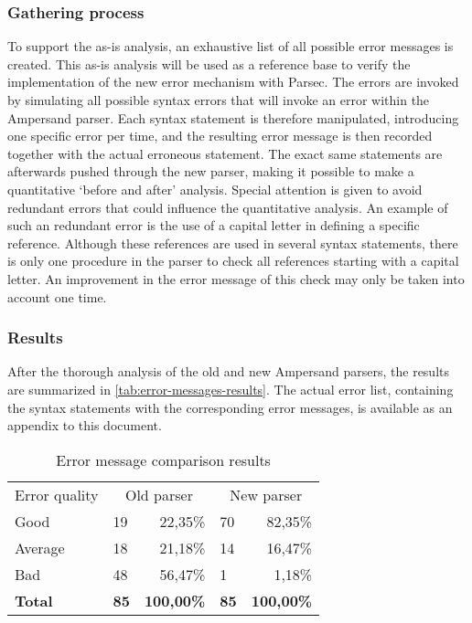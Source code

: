 \subsubsection{Gathering process}

To support the as-is analysis, an exhaustive list of all possible error messages is created.
This as-is analysis will be used as a reference base to verify the implementation of the new error mechanism with Parsec.
The errors are invoked by simulating all possible syntax errors that will invoke an error within the Ampersand parser.
Each syntax statement is therefore manipulated, introducing one specific error per time, and the resulting error message is then recorded together with the actual erroneous statement.
The exact same statements are afterwards pushed through the new parser, making it possible to make a quantitative `before and after' analysis.
Special attention is given to avoid redundant errors that could influence the quantitative analysis. 
An example of such an redundant error is the use of a capital letter in defining a specific reference. 
Although these references are used in several syntax statements, there is only one procedure in the parser to check all references starting with a capital letter.
An improvement in the error message of this check may only be taken into account one time.

\subsubsection{Results}
After the thorough analysis of the old and new Ampersand parsers, the results are summarized in \autoref{tab:error-messages-results}.
The actual error list, containing the syntax statements with the corresponding error messages, is available as an appendix to this document.

\begin{table}[h]
  \centering
	\begin{tabular}{llrlr}
    Error quality  & \multicolumn{2}{c}{Old parser} & \multicolumn{2}{c}{New parser} \\
		Good           & 19          & 22,35\%          & 70          & 82,35\%          \\
		Average        & 18          & 21,18\%          & 14          & 16,47\%          \\
		Bad            & 48          & 56,47\%          & 1           &  1,18\%          \\
		\rowcolor[HTML]{BBBBBB}
		\textbf{Total} & \textbf{85} & \textbf{100,00\%} & \textbf{85} & \textbf{100,00\%}
	\end{tabular}
  \caption{Error message comparison results}
  \label{tab:error-messages-results}
\end{table}

